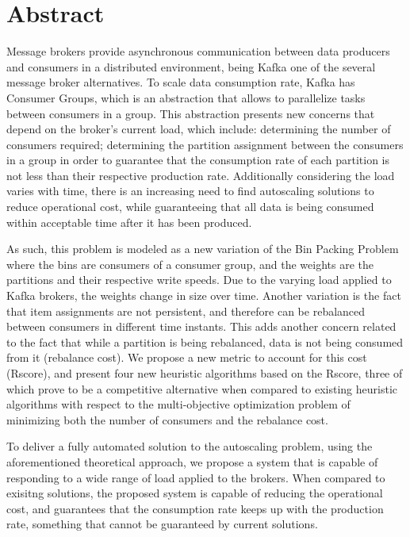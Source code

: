 \chapter*{Abstract}

Message brokers provide asynchronous communication between data producers and
consumers in a distributed environment, being Kafka one of the several message
broker alternatives. To scale data consumption rate, Kafka has Consumer Groups,
which is an abstraction that allows to parallelize tasks between consumers in a
group. This abstraction presents new concerns that depend on the broker's
current load, which include: determining the number of consumers required;
determining the partition assignment between the consumers in a group in order
to guarantee that the consumption rate of each partition is not less than their
respective production rate. Additionally considering the load varies with time,
there is an increasing need to find autoscaling solutions to reduce operational
cost, while guaranteeing that all data is being consumed within acceptable time
after it has been produced.

As such, this problem is modeled as a new variation of the Bin Packing Problem
where the bins are consumers of a consumer group, and the weights are the
partitions and their respective write speeds. Due to the varying load applied to
Kafka brokers, the weights change in size over time. Another variation is the
fact that item assignments are not persistent, and therefore can be rebalanced
between consumers in different time instants. This adds another concern related
to the fact that while a partition is being rebalanced, data is not being
consumed from it (rebalance cost). We propose a new metric to account for this
cost (Rscore), and present four new heuristic algorithms based on the Rscore,
three of which prove to be a competitive alternative when compared to existing
heuristic algorithms with respect to the multi-objective optimization problem of
minimizing both the number of consumers and the rebalance cost.

To deliver a fully automated solution to the autoscaling problem, using the
aforementioned theoretical approach, we propose a system that is capable of
responding to a wide range of load applied to the brokers. When compared to
exisitng solutions, the proposed system is capable of reducing the operational
cost, and guarantees that the consumption rate keeps up with the production
rate, something that cannot be guaranteed by current solutions. 

